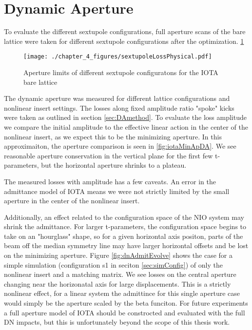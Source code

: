 \section{Dynamic Aperture} \label{sec:DA}
To evaluate the different sextupole configurations, full aperture scans of the bare lattice were taken for different sextupole configurations after the optimization. \ref{fig:bareDA}

\begin{figure}
	\centering
	\texttt{[image: ./chapter\_4\_figures/sextupoleLossPhysical.pdf]}
	\caption{Aperture limits of different sextupole configuratons for the IOTA bare lattice}
	\label{fig:bareDA}
\end{figure}

The dynamic aperture was measured for different lattice configurations and nonlinear insert settings. The losses along fixed amplitude ratio "spoke" kicks were taken as outlined in section \ref{sec:DAmethod}. To evaluate the loss amplitude we compare the initial amplitude to the effective linear action in the center of the nonlinear insert, as we expect this to be the minimizing aperture. In this approximaiton, the aperture comparison is seen in \ref{fig:iotaMinApDA}. We see reasonable aperture conservation in the vertical plane for the first few t-parameters, but the horizontal aperture shrinks to a plateau.

The measured losses with amplitude has a few caveats. An error in the admittance model of IOTA means we were not strictly limited by the small aperture in the center of the nonlinear insert.

Additionally, an effect related to the configuration space of the NIO system may shrink the admittance. For larger t-parameters, the configuration space begins to take on an "hourglass" shape, so for a given horizontal axis positon, parts of the beam off the median symmetry line may have larger horizontal offsets and be lost on the minimizing aperture. Figure \ref{fig:dnAdmitEvolve} shows the case for a simple simulation (configuration s1 in seciton \ref{sec:simConfig}) of only the nonlinear insert and a matching matrix. We see losses on the central aperture changing near the horizonatal axis for large displacements. This is a strictly nonlinear effect, for a linear system the admittince for this single aperture case would simply be the aperture scaled by the beta funciton. For future experiments a full aperture model of IOTA should be constrocted and evaluated with the full DN impacts, but this is unfortunately beyond the scope of this thesis work.

